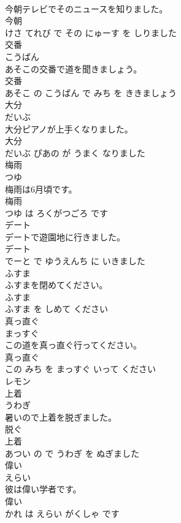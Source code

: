 \documentclass[8pt]{extreport}
\begin{document}
\begin{CJK}{UTF8}{min}
\\	今朝テレビでそのニュースを知りました。	
\\	今朝 
\\	けさ てれび で その にゅーす を しりました			
\\	交番	
\\	こうばん			
\\	あそこの交番で道を聞きましょう。	
\\	交番 
\\	あそこ の こうばん で みち を ききましょう			
\\	大分	
\\	だいぶ			
\\	大分ピアノが上手くなりました。	
\\	大分 
\\	だいぶ ぴあの が うまく なりました			
\\	梅雨	
\\	つゆ			
\\	梅雨は6月頃です。	
\\	梅雨 
\\	つゆ は ろくがつごろ です			
\\	デート	
\\	デートで遊園地に行きました。	
\\	デート 
\\	でーと で ゆうえんち に いきました			
\\	ふすま	
\\	ふすまを閉めてください。	
\\	ふすま 
\\	ふすま を しめて ください			
\\	真っ直ぐ	
\\	まっすぐ			
\\	この道を真っ直ぐ行ってください。	
\\	真っ直ぐ 
\\	この みち を まっすぐ いって ください			
\\	レモン	
\\	上着	
\\	うわぎ			
\\	暑いので上着を脱ぎました。	
\\	脱ぐ 
\\	上着 
\\	あつい の で うわぎ を ぬぎました			
\\	偉い	
\\	えらい			
\\	彼は偉い学者です。	
\\	偉い 
\\	かれ は えらい がくしゃ です			

\end{CJK}
\end{document}
